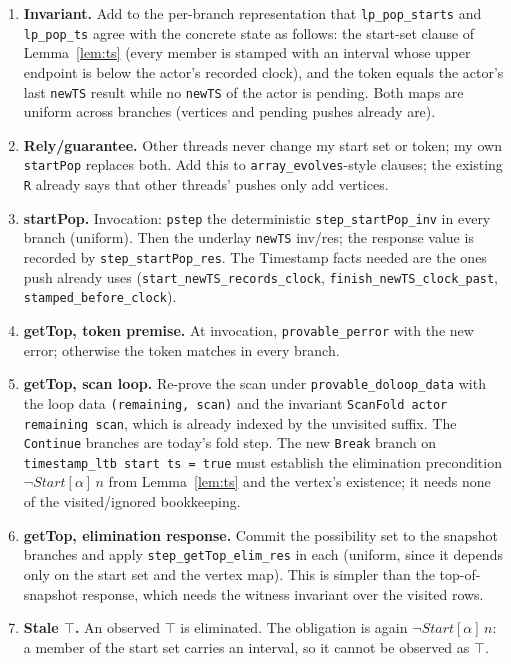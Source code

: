 \documentclass[11pt]{article}
\theoremstyle{definition}
\theoremstyle{remark}
\newcommand{\code}[1]{\texttt{#1}}
\newcommand{\Start}{\mathit{Start}}
\newcommand{\sol}[1]{\textbf{#1}}
\newcommand{\TSTop}{\top}
\begin{document}
\begin{enumerate}[nosep]
\item \sol{Invariant.} Add to the per-branch representation that
  \code{lp\_pop\_starts} and \code{lp\_pop\_ts} agree with the concrete
  state as follows: the start-set clause of Lemma~\ref{lem:ts} (every
  member is stamped with an interval whose upper endpoint is below the
  actor's recorded clock), and the token equals the actor's last
  \code{newTS} result while no \code{newTS} of the actor is pending. Both
  maps are uniform across branches (vertices and pending pushes already
  are).
\item \sol{Rely/guarantee.} Other threads never change my start set or
  token; my own \code{startPop} replaces both. Add this to
  \code{array\_evolves}-style clauses; the existing \code{R} already says
  that other threads' pushes only add vertices.
\item \sol{startPop.} Invocation: \code{pstep} the deterministic
  \code{step\_startPop\_inv} in every branch (uniform). Then the
  underlay \code{newTS} inv/res; the response value is recorded by
  \code{step\_startPop\_res}. The Timestamp facts needed are the ones
  push already uses (\code{start\_newTS\_records\_clock},
  \code{finish\_newTS\_clock\_past}, \code{stamped\_before\_clock}).
\item \sol{getTop, token premise.} At invocation, \code{provable\_perror}
  with the new error; otherwise the token matches in every branch.
\item \sol{getTop, scan loop.} Re-prove the scan under
  \code{provable\_doloop\_data} with the loop data \code{(remaining, scan)}
  and the invariant \code{ScanFold actor remaining scan}, which is
  already indexed by the unvisited suffix. The \code{Continue} branches
  are today's fold step. The new \code{Break} branch on
  \code{timestamp\_ltb start ts = true} must establish the elimination
  precondition $\neg\Start[\alpha]\,n$ from Lemma~\ref{lem:ts} and the
  vertex's existence; it needs none of the visited/ignored bookkeeping.
\item \sol{getTop, elimination response.} Commit the possibility set to
  the snapshot branches and apply \code{step\_getTop\_elim\_res} in each
  (uniform, since it depends only on the start set and the vertex map).
  This is simpler than the top-of-snapshot response, which needs the
  witness invariant over the visited rows.
\item \sol{Stale $\TSTop$.} An observed $\TSTop$ is eliminated. The
  obligation is again $\neg\Start[\alpha]\,n$: a member of the start set
  carries an interval, so it cannot be observed as $\TSTop$.
\end{enumerate}
\end{document}
